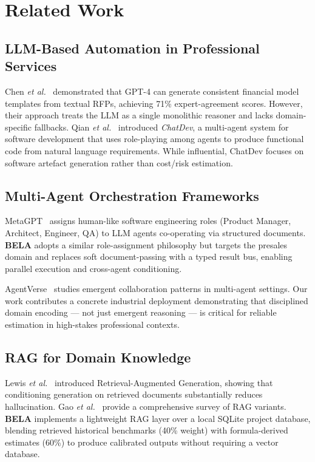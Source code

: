 \documentclass[10pt,twocolumn]{article}
\newcommand{\bela}{\textbf{BELA}}
\newcommand{\etal}{\textit{et al.}}
\begin{document}
\section{Related Work}
\label{sec:related}

\subsection{LLM-Based Automation in Professional Services}

Chen \etal~\cite{chen2024llmprofessional} demonstrated that GPT-4 can generate
consistent financial model templates from textual RFPs, achieving 71\%
expert-agreement scores. However, their approach treats the LLM as a
single monolithic reasoner and lacks domain-specific fallbacks.
Qian \etal~\cite{qian2023communicative} introduced \textit{ChatDev}, a
multi-agent system for software development that uses role-playing among
agents to produce functional code from natural language requirements.
While influential, ChatDev focuses on software artefact generation
rather than cost/risk estimation.

\subsection{Multi-Agent Orchestration Frameworks}

MetaGPT~\cite{hong2023metagpt} assigns human-like software engineering roles
(Product Manager, Architect, Engineer, QA) to LLM agents co-operating via
structured documents. \bela{} adopts a similar role-assignment philosophy
but targets the presales domain and replaces soft document-passing with
a typed result bus, enabling parallel execution and cross-agent conditioning.

AgentVerse~\cite{chen2023agentverse} studies emergent collaboration patterns
in multi-agent settings. Our work contributes a concrete industrial deployment
demonstrating that disciplined domain encoding — not just emergent reasoning —
is critical for reliable estimation in high-stakes professional contexts.

\subsection{RAG for Domain Knowledge}

Lewis \etal~\cite{lewis2020rag} introduced Retrieval-Augmented Generation,
showing that conditioning generation on retrieved documents substantially
reduces hallucination. Gao \etal~\cite{gao2023retrieval} provide a
comprehensive survey of RAG variants. \bela{} implements a lightweight
RAG layer over a local SQLite project database, blending retrieved
historical benchmarks (40\% weight) with formula-derived estimates (60\%)
to produce calibrated outputs without requiring a vector database.
\end{document}
